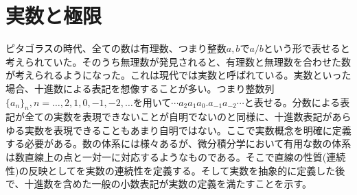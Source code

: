 \section{実数と極限}

ピタゴラスの時代、全ての数は有理数、つまり整数$a, b$で$a/b$という形で表せると考えられていた。そのうち無理数が発見されると、有理数と無理数を合わせた数が考えられるようになった。これは現代では実数と呼ばれている。実数といった場合、十進数による表記を想像することが多い。つまり整数列$\{a_n\}_n, n = \ldots, 2, 1, 0, -1, -2,\ldots$を用いて$\cdots a_2a_1a_0.a_{-1}a_{-2}\cdots$と表せる。分数による表記が全ての実数を表現できないことが自明でないのと同様に、十進数表記があらゆる実数を表現できることもあまり自明ではない。ここで実数概念を明確に定義する必要がある。数の体系には様々あるが、微分積分学において有用な数の体系は数直線上の点と一対一に対応するようなものである。そこで直線の性質(連続性)の反映としてを実数の連続性を定義する。そして実数を抽象的に定義した後で、十進数を含めた一般の小数表記が実数の定義を満たすことを示す。

